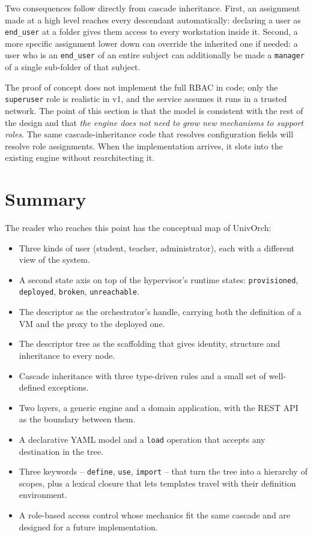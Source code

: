 Two consequences follow directly from cascade inheritance. First,
an assignment made at a high level reaches every descendant
automatically: declaring a user as \texttt{end\_user} at a folder
gives them access to every workstation inside it. Second, a more
specific assignment lower down can override the inherited one if
needed: a user who is an \texttt{end\_user} of an entire subject
can additionally be made a \texttt{manager} of a single
sub-folder of that subject.

The proof of concept does not implement the full RBAC in code; only
the \texttt{superuser} role is realistic in v1, and the service
assumes it runs in a trusted network. The point of this section is
that the model is consistent with the rest of the design and that
\emph{the engine does not need to grow new mechanisms to support
roles}. The same cascade-inheritance code that resolves
configuration fields will resolve role assignments. When the
implementation arrives, it slots into the existing engine without
rearchitecting it.

\section{Summary}
\label{sec:resumen-conceptos}

The reader who reaches this point has the conceptual map of
UnivOrch:

\begin{itemize}
  \item Three kinds of user (student, teacher, administrator), each
        with a different view of the system.
  \item A second state axis on top of the hypervisor's runtime
        states: \texttt{provisioned}, \texttt{deployed},
        \texttt{broken}, \texttt{unreachable}.
  \item The descriptor as the orchestrator's handle, carrying both
        the definition of a VM and the proxy to the deployed one.
  \item The descriptor tree as the scaffolding that gives identity,
        structure and inheritance to every node.
  \item Cascade inheritance with three type-driven rules and a
        small set of well-defined exceptions.
  \item Two layers, a generic engine and a domain application, with
        the REST API as the boundary between them.
  \item A declarative YAML model and a \texttt{load} operation that
        accepts any destination in the tree.
  \item Three keywords -- \texttt{define}, \texttt{use},
        \texttt{import} -- that turn the tree into a hierarchy of
        scopes, plus a lexical closure that lets templates travel
        with their definition environment.
  \item A role-based access control whose mechanics fit the same
        cascade and are designed for a future implementation.
\end{itemize}

